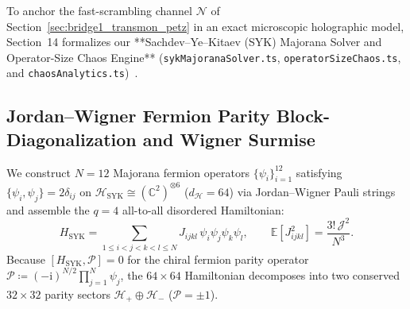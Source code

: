 \documentclass[11pt,a4paper,reqno]{article}
\theoremstyle{plain}
\theoremstyle{definition}
\theoremstyle{remark}
\numberwithin{equation}{section}
\begin{document}
To anchor the fast-scrambling channel $\mathcal{N}$ of Section~\ref{sec:bridge1_transmon_petz} in an exact microscopic holographic model, Section~14 formalizes our **Sachdev--Ye--Kitaev (SYK) Majorana Solver and Operator-Size Chaos Engine** (\texttt{sykMajoranaSolver.ts}, \texttt{operatorSizeChaos.ts}, and \texttt{chaosAnalytics.ts})~\cite{MaldacenaShenkerStanford2016,SachdevYe1993}.

\subsection{Jordan--Wigner Fermion Parity Block-Diagonalization and Wigner Surmise}
We construct $N = 12$ Majorana fermion operators $\{\psi_i\}_{i=1}^{12}$ satisfying $\{\psi_i, \psi_j\} = 2\delta_{ij}$ on $\mathcal{H}_{\mathrm{SYK}} \cong (\mathbb{C}^2)^{\otimes 6}$ ($d_{\mathcal{H}} = 64$) via Jordan--Wigner Pauli strings and assemble the $q=4$ all-to-all disordered Hamiltonian:
\begin{equation}
\label{eq:syk_q4_hamiltonian}
H_{\mathrm{SYK}} = \sum_{1 \le i < j < k < l \le N} J_{ijkl}\,\psi_i\psi_j\psi_k\psi_l, \qquad
\mathbb{E}[J_{ijkl}^2] = \frac{3!\,\mathcal{J}^2}{N^3}.
\end{equation}
Because $[H_{\mathrm{SYK}}, \mathcal{P}] = 0$ for the chiral fermion parity operator $\mathcal{P} \coloneqq (-\mathrm{i})^{N/2}\prod_{j=1}^N \psi_j$, the $64\times 64$ Hamiltonian decomposes into two conserved $32\times 32$ parity sectors $\mathcal{H}_+ \oplus \mathcal{H}_-$ ($\mathcal{P} = \pm 1$).
\end{document}
